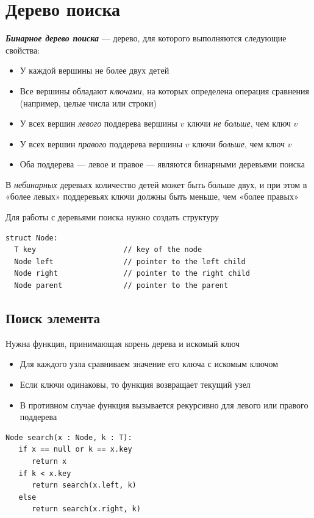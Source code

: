 \documentclass[a4paper]{article}
\begin{document}
\newpage
\section{Дерево поиска}
\textbf{\textit{Бинарное дерево поиска}} — дерево, для которого выполняются следующие свойства:

\begin{itemize}
    \item У каждой вершины не более двух детей
    \item Все вершины обладают \textit{ключами}, на которых определена операция сравнения (например, целые числа или строки)
    \item У всех вершин \textit{левого} поддерева вершины $v$ ключи \textit{не больше}, чем ключ $v$
    \item У всех вершин \textit{правого} поддерева вершины $v$ ключи \textit{больше}, чем ключ $v$
    \item Оба поддерева — левое и правое — являются бинарными деревьями поиска
\end{itemize}

В \textit{небинарных} деревьях количество детей может быть больше двух, и при этом в «более левых» поддеревьях ключи должны быть меньше, чем «более правых»

Для работы с деревьями поиска нужно создать структуру

\begin{lstlisting}
struct Node:
  T key                    // key of the node
  Node left                // pointer to the left child
  Node right               // pointer to the right child
  Node parent              // pointer to the parent
\end{lstlisting}

\subsection{Поиск элемента}
Нужна функция, принимающая корень дерева и искомый ключ

\begin{itemize}
    \item Для каждого узла сравниваем значение его ключа с искомым ключом
    \item Если ключи одинаковы, то функция возвращает текущий узел
    \item В противном случае функция вызывается рекурсивно для левого или правого поддерева
\end{itemize}

\begin{lstlisting}
Node search(x : Node, k : T):
   if x == null or k == x.key
      return x
   if k < x.key
      return search(x.left, k)
   else
      return search(x.right, k)
\end{lstlisting}
\end{document}
